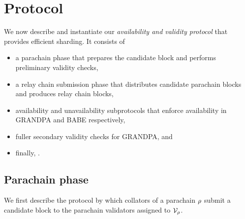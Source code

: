 
\section{Protocol} %
\label{sec:protocol}

We now describe and instantiate our {\em availability and validity protocol} that provides efficient sharding.  It consists of 
\begin{itemize}
\item a parachain phase that prepares the candidate block and performs preliminary validity checks,
\item a relay chain submission phase that distributes candidate parachain blocks and produces relay chain blocks,
\item availability and unavailability subprotocols that enforce availability in GRANDPA and BABE respectively,
\item fuller secondary validity checks for GRANDPA, and
\item finally, .
\end{itemize}



\subsection{Parachain phase} 

We first describe the protocol by which collators of a parachain $\rho$ submit a candidate block to the parachain validators assigned to $\mathcal{V}_{\rho}$.

\smallskip

